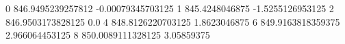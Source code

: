 0 846.9495239257812 -0.00079345703125
1 845.4248046875 -1.5255126953125
2 846.9503173828125 0.0
4 848.8126220703125 1.8623046875
6 849.9163818359375 2.966064453125
8 850.0089111328125 3.05859375
